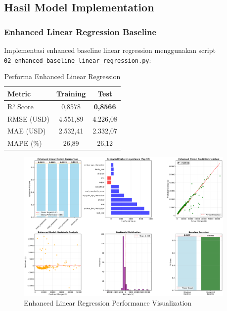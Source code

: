 \subsection{Hasil Model Implementation}
\label{subsec:hasil-model}

\subsubsection{Enhanced Linear Regression Baseline}

Implementasi enhanced baseline linear regression menggunakan script \texttt{02\_enhanced\_baseline\_linear\_regression.py}:

\begin{table}[H]
\centering
\caption{Performa Enhanced Linear Regression}
\label{tab:linear-performance}
\begin{tabular}{|l|c|c|}
\hline
\textbf{Metric} & \textbf{Training} & \textbf{Test} \\
\hline
R² Score & 0,8578 & \textbf{0,8566} \\
RMSE (USD) & 4.551,89 & 4.226,08 \\
MAE (USD) & 2.532,41 & 2.332,07 \\
MAPE (\%) & 26,89 & 26,12 \\
\hline
\end{tabular}
\end{table}

\begin{figure}[H]
\centering
\includegraphics[width=0.95\textwidth]{../results/plots/02_enhanced_baseline_performance.png}
\caption{Enhanced Linear Regression Performance Visualization}
\label{fig:linear-performance}
\end{figure}

